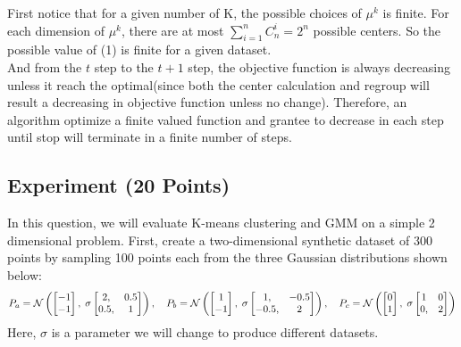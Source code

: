 \begin{enumerate}
\begin{soln}
    First notice that for a given number of K, the possible choices of $\mu^k$ is finite. For each dimension of $\mu^k$, there are at most $\sum_{i=1}^{n} C_{n}^{i}=2^n$ possible centers. So the possible value of (1) is finite for a given dataset. \\
    And from the $t$ step to the $t+1$ step, the objective function is always decreasing unless it reach the optimal(since both the center calculation and regroup will result a decreasing in objective function unless no change).   
    Therefore, an algorithm optimize a finite valued function and grantee to decrease in each step until stop will terminate in a finite number of steps.
\end{soln}

\end{enumerate}



\subsection{Experiment (20 Points)}

In this question, we will evaluate
K-means clustering and GMM on a simple 2 dimensional problem.
First, create a two-dimensional synthetic dataset of 300 points by sampling 100 points each from the
three Gaussian distributions shown below:
\[
P_a = \mathcal{N}\left(
\begin{bmatrix}
-1 \\ -1
\end{bmatrix},
\;
\sigma\begin{bmatrix}
2, &0.5 \\ 0.5, &1
\end{bmatrix}
\right),
\quad
P_b = \mathcal{N}\left(
\begin{bmatrix}
1 \\ -1
\end{bmatrix},
\;
 \sigma\begin{bmatrix}
1, &-0.5 \\ -0.5, &2
\end{bmatrix}
\right),
\quad
P_c = \mathcal{N}\left(
\begin{bmatrix}
0 \\ 1
\end{bmatrix},
\;
 \sigma\begin{bmatrix}
1 &0 \\ 0, &2
\end{bmatrix}
\right)
\]
Here, $\sigma$ is a parameter we will change to produce different datasets.

